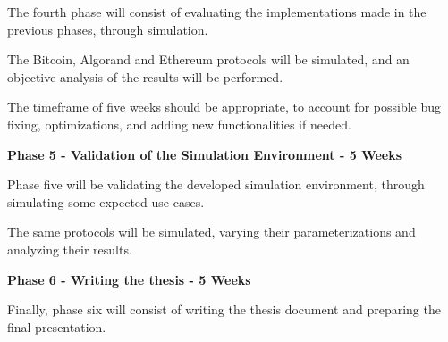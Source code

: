 The fourth phase will consist of evaluating the implementations made in the previous phases, through simulation.

The Bitcoin, Algorand and Ethereum protocols will be simulated, and an objective analysis of the results will be performed.

The timeframe of five weeks should be appropriate, to account for possible bug fixing, optimizations, and adding new functionalities if needed.

\vspace{0.25cm}

\textbf{Phase 5 - Validation of the Simulation Environment - 5 Weeks}

Phase five will be validating the developed simulation environment, through simulating some expected use cases.

The same protocols will be simulated, varying their parameterizations and analyzing their results.

\vspace{0.25cm}

\textbf{Phase 6 - Writing the thesis - 5 Weeks}

Finally, phase six will consist of writing the thesis document and preparing the final presentation.


